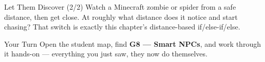 \documentclass[aspectratio=169]{beamer}
\begin{document}
\begin{frame}{Let Them Discover (2/2)}
    \Large
    Watch a Minecraft zombie or spider from a safe distance, then get close. At roughly what distance does it notice and start chasing? That switch is exactly this chapter's distance-based if/else-if/else.
\end{frame}

\begin{frame}{Your Turn}
    \Large
    Open the student map, find \textbf{G8 — Smart NPCs}, and work through it
    hands-on --- everything you just saw, they now do themselves.
\end{frame}
\end{document}
